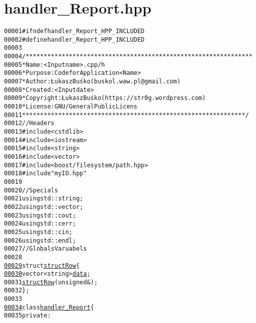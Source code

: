 \hypertarget{handler__Report_8hpp_source}{
\section{handler\_\-Report.hpp}
}


\begin{footnotesize}\begin{alltt}
00001 \textcolor{preprocessor}{#ifndef handler\_Report\_HPP\_INCLUDED}
00002 \textcolor{preprocessor}{}\textcolor{preprocessor}{#define handler\_Report\_HPP\_INCLUDED}
00003 \textcolor{preprocessor}{}
00004 \textcolor{comment}{/***************************************************************}
00005 \textcolor{comment}{ * Name:      <Input name>.cpp/h}
00006 \textcolor{comment}{ * Purpose:   Code for Application <Name>}
00007 \textcolor{comment}{ * Author:    Łukasz Buśko (buskol.waw.pl@gmail.com)}
00008 \textcolor{comment}{ * Created:   <Input date>}
00009 \textcolor{comment}{ * Copyright: Łukasz Buśko (https://str0g.wordpress.com)}
00010 \textcolor{comment}{ * License:   GNU / General Public Licens}
00011 \textcolor{comment}{ **************************************************************/}
00012 \textcolor{comment}{//Headers}
00013 \textcolor{preprocessor}{#include <cstdlib>}
00014 \textcolor{preprocessor}{#include <iostream>}
00015 \textcolor{preprocessor}{#include <string>}
00016 \textcolor{preprocessor}{#include <vector>}
00017 \textcolor{preprocessor}{#include <boost/filesystem/path.hpp>}
00018 \textcolor{preprocessor}{#include "myIO.hpp"}
00019 
00020 \textcolor{comment}{//Specials}
00021 \textcolor{keyword}{using} std::string;
00022 \textcolor{keyword}{using} std::vector;
00023 \textcolor{keyword}{using} std::cout;
00024 \textcolor{keyword}{using} std::cerr;
00025 \textcolor{keyword}{using} std::cin;
00026 \textcolor{keyword}{using} std::endl;
00027 \textcolor{comment}{//Globals Varuabels}
00028 
\hypertarget{handler__Report_8hpp_source_l00029}{}\hyperlink{structstructRow}{00029} \textcolor{keyword}{struct }\hyperlink{structstructRow}{structRow}\{
\hypertarget{handler__Report_8hpp_source_l00030}{}\hyperlink{structstructRow_a627f7dc245b2dd29b2c94e02f5347573}{00030}     vector<string> \hyperlink{structstructRow_a627f7dc245b2dd29b2c94e02f5347573}{data}; 
00031     \hyperlink{structstructRow_a09213fb7bb170a682869db469718761e}{structRow}(\textcolor{keywordtype}{unsigned} &);
00032 \};
00033 
\hypertarget{handler__Report_8hpp_source_l00034}{}\hyperlink{classhandler__Report}{00034} \textcolor{keyword}{class }\hyperlink{classhandler__Report}{handler_Report}\{
00035     \textcolor{keyword}{private}:

\end{alltt}
\end{footnotesize}
